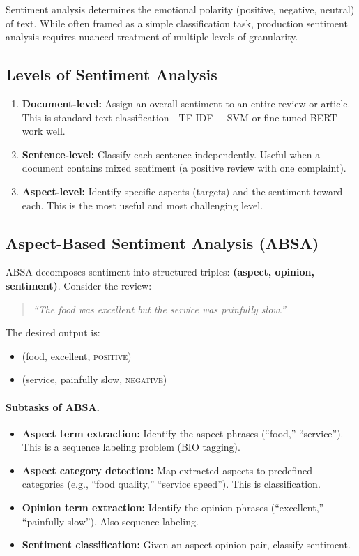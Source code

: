 Sentiment analysis determines the emotional polarity (positive, negative, neutral) of text.
While often framed as a simple classification task, production sentiment analysis requires
nuanced treatment of multiple levels of granularity.

\subsection{Levels of Sentiment Analysis}

\begin{enumerate}[label=\textbf{\arabic*.}]
    \item \textbf{Document-level:} Assign an overall sentiment to an entire review or article.
          This is standard text classification---TF-IDF + SVM or fine-tuned BERT work well.
    \item \textbf{Sentence-level:} Classify each sentence independently.  Useful when a
          document contains mixed sentiment (a positive review with one complaint).
    \item \textbf{Aspect-level:} Identify specific aspects (targets) and the sentiment toward
          each.  This is the most useful and most challenging level.
\end{enumerate}

\subsection{Aspect-Based Sentiment Analysis (ABSA)}

ABSA decomposes sentiment into structured triples: \textbf{(aspect, opinion, sentiment)}.
Consider the review:

\begin{quote}
\emph{``The food was excellent but the service was painfully slow.''}
\end{quote}

The desired output is:
\begin{itemize}
    \item (food, excellent, \textsc{positive})
    \item (service, painfully slow, \textsc{negative})
\end{itemize}

\paragraph{Subtasks of ABSA.}
\begin{itemize}
    \item \textbf{Aspect term extraction:} Identify the aspect phrases (``food,'' ``service'').
          This is a sequence labeling problem (BIO tagging).
    \item \textbf{Aspect category detection:} Map extracted aspects to predefined categories
          (e.g., ``food quality,'' ``service speed'').  This is classification.
    \item \textbf{Opinion term extraction:} Identify the opinion phrases (``excellent,''
          ``painfully slow'').  Also sequence labeling.
    \item \textbf{Sentiment classification:} Given an aspect-opinion pair, classify sentiment.
\end{itemize}

